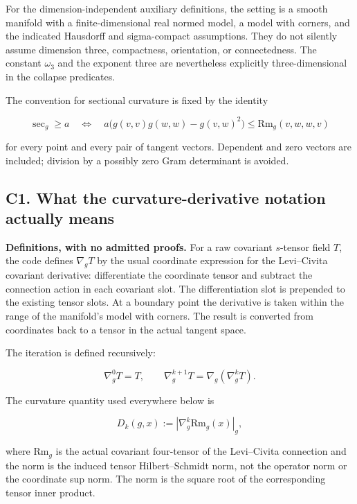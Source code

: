 \documentclass[
  letterpaper,
  11pt]{article}
\begin{document}
For the dimension-independent auxiliary definitions, the setting is a
smooth manifold with a finite-dimensional real normed model, a model
with corners, and the indicated Hausdorff and sigma-compact assumptions.
They do not silently assume dimension three, compactness, orientation,
or connectedness. The constant \(\omega_3\) and the exponent three are
nevertheless explicitly three-dimensional in the collapse predicates.

The convention for sectional curvature is fixed by the identity

\[
 \sec_g\geq a\quad\Longleftrightarrow\quad
 a\bigl(g(v,v)g(w,w)-g(v,w)^2\bigr)\leq \mathrm{Rm}_g(v,w,w,v)
\]

for every point and every pair of tangent vectors. Dependent and zero
vectors are included; division by a possibly zero Gram determinant is
avoided.

\subsection{C1. What the curvature-derivative notation actually
means}\label{collapse-tensor}

\textbf{Definitions, with no admitted proofs.} For a raw covariant
\(s\)-tensor field \(T\), the code defines \(\nabla_g T\) by the usual
coordinate expression for the Levi--Civita covariant derivative:
differentiate the coordinate tensor and subtract the connection action
in each covariant slot. The differentiation slot is prepended to the
existing tensor slots. At a boundary point the derivative is taken
within the range of the manifold's model with corners. The result is
converted from coordinates back to a tensor in the actual tangent space.

The iteration is defined recursively:

\[
 \nabla_g^0T=T,\qquad \nabla_g^{k+1}T=\nabla_g(\nabla_g^kT).
\]

The curvature quantity used everywhere below is

\[
 D_k(g,x):=\left|\nabla_g^k\mathrm{Rm}_g(x)\right|_g,
\]

where \(\mathrm{Rm}_g\) is the actual covariant four-tensor of the
Levi--Civita connection and the norm is the induced tensor
Hilbert--Schmidt norm, not the operator norm or the coordinate sup norm.
The norm is the square root of the corresponding tensor inner product.
\end{document}
